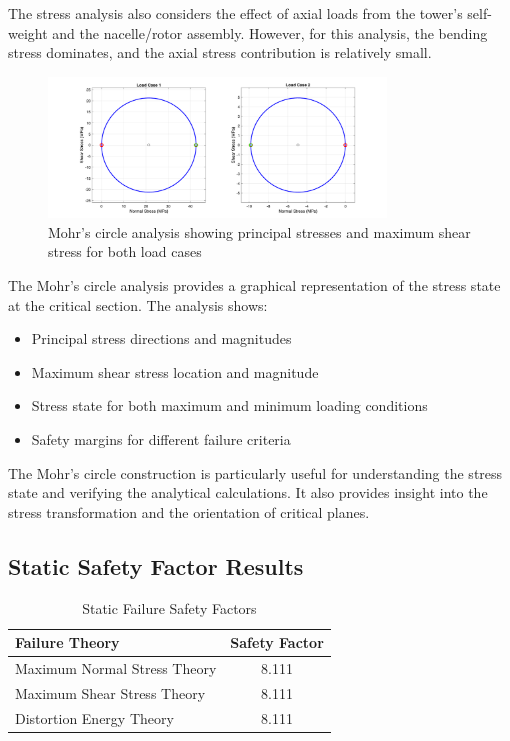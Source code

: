 \documentclass[12pt]{article}
\begin{document}
The stress analysis also considers the effect of axial loads from the tower's self-weight and the nacelle/rotor assembly. However, for this analysis, the bending stress dominates, and the axial stress contribution is relatively small.

\begin{figure}[H]
    \centering
    \includegraphics[width=0.8\textwidth]{PNGS/Mohr_Circle_Analysis.png}
    \caption{Mohr's circle analysis showing principal stresses and maximum shear stress for both load cases}
    \label{fig:mohr}
\end{figure}

The Mohr's circle analysis provides a graphical representation of the stress state at the critical section. The analysis shows:

\begin{itemize}
    \item Principal stress directions and magnitudes
    \item Maximum shear stress location and magnitude
    \item Stress state for both maximum and minimum loading conditions
    \item Safety margins for different failure criteria
\end{itemize}

The Mohr's circle construction is particularly useful for understanding the stress state and verifying the analytical calculations. It also provides insight into the stress transformation and the orientation of critical planes.

\subsection{Static Safety Factor Results}

\begin{table}[H]
\centering
\caption{Static Failure Safety Factors}
\begin{tabular}{@{}lc@{}}
\toprule
\textbf{Failure Theory} & \textbf{Safety Factor} \\
\midrule
Maximum Normal Stress Theory & 8.111 \\
Maximum Shear Stress Theory & 8.111 \\
Distortion Energy Theory & 8.111 \\
\bottomrule
\end{tabular}
\end{table}
\end{document}
